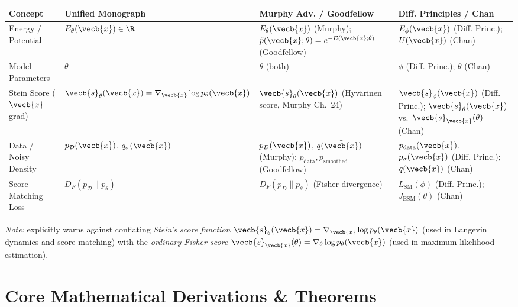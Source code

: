 \documentclass[../../../../master.tex]{subfiles}
\begin{document}
\begin{crossbook}
\label{tab:ebm:notation}
\renewcommand{\arraystretch}{1.25}
\begin{tabularx}{\textwidth}{@{} >{\raggedright\arraybackslash}p{2.5cm} >{\raggedright\arraybackslash}X >{\raggedright\arraybackslash}X >{\raggedright\arraybackslash}X @{}}
\toprule
\textbf{Concept} & \textbf{Unified Monograph} & \textbf{Murphy Adv. / Goodfellow} & \textbf{Diff. Principles / Chan} \\
\midrule
Energy / Potential & $E_\theta(\vecb{x}) \in \R$ & $E_\theta(\vecb{x})$ (Murphy); $\tilde{p}(\vecb{x};\theta) = e^{-E(\vecb{x};\theta)}$ (Goodfellow) & $E_\phi(\vecb{x})$ (Diff. Princ.); $U(\vecb{x})$ (Chan) \\
Model Parameters & $\theta$ & $\theta$ (both) & $\phi$ (Diff. Princ.); $\theta$ (Chan) \\
Stein Score ($\vecb{x}$-grad) & $\vecb{s}_\theta(\vecb{x}) = \nabla_{\vecb{x}} \log p_\theta(\vecb{x})$ & $\vecb{s}_\theta(\vecb{x})$ (Hyv\"arinen score, Murphy Ch.~24) & $\vecb{s}_\phi(\vecb{x})$ (Diff. Princ.); $\vecb{s}_\theta(\vecb{x})$ vs.\ $\vecb{s}_{\vecb{x}}(\theta)$ (Chan) \\
Data / Noisy Density & $p_{\mathcal{D}}(\vecb{x})$, $q_\sigma(\tilde{\vecb{x}})$ & $p_D(\vecb{x})$, $q(\tilde{\vecb{x}})$ (Murphy); $p_{\mathrm{data}}, p_{\mathrm{smoothed}}$ (Goodfellow) & $p_{\mathrm{data}}(\vecb{x})$, $p_\sigma(\tilde{\vecb{x}})$ (Diff. Princ.); $q(\vecb{x})$ (Chan) \\
Score Matching Loss & $D_F(p_{\mathcal{D}} \| p_\theta)$ & $D_F(p_D \| p_\theta)$ (Fisher divergence) & $L_{\mathrm{SM}}(\phi)$ (Diff. Princ.); $J_{\mathrm{ESM}}(\theta)$ (Chan) \\
\bottomrule
\end{tabularx}
\vspace{0.4em}
\small\textit{Note:}  explicitly warns against conflating \emph{Stein's score function} $\vecb{s}_\theta(\vecb{x}) = \nabla_{\vecb{x}} \log p_\theta(\vecb{x})$ (used in Langevin dynamics and score matching) with the \emph{ordinary Fisher score} $\vecb{s}_{\vecb{x}}(\theta) = \nabla_\theta \log p_\theta(\vecb{x})$ (used in maximum likelihood estimation).
\end{crossbook}

\section{Core Mathematical Derivations \& Theorems}
\label{sec:ebm:derivations}
\end{document}
